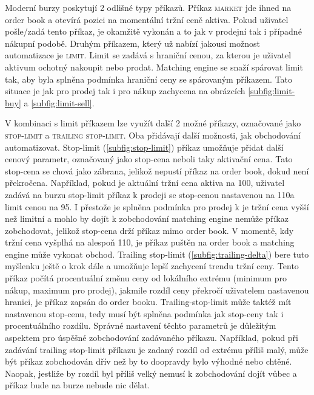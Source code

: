 Moderní burzy poskytují 2 odlišné typy příkazů. Příkaz \textsc{market} jde ihned na order book a otevírá pozici na momentální tržní ceně aktiva. Pokud uživatel
pošle/zadá tento příkaz, je okamžitě vykonán a to jak v prodejní tak i případné nákupní podobě. Druhým příkazem, který už nabízí jakousi možnost automatizace
je \textsc{limit}.
Limit se zadává s hraniční cenou, za kterou je uživatel aktivum ochotný nakoupit nebo prodat. Matching engine se snaží spárovat limit tak, aby byla splněna podmínka
hraniční ceny se spárovaným příkazem. Tato situace je jak pro prodej tak i pro nákup zachycena na obrázcích \ref{subfig:limit-buy} a \ref{subfig:limit-sell}.

V kombinaci s limit příkazem lze využít další 2 možné příkazy, označované jako \textsc{stop-limit} a \textsc{trailing stop-limit}. Oba přidávají další možnosti,
jak obchodování automatizovat. Stop-limit (\ref{subfig:stop-limit}) příkaz umožňuje přidat další cenový parametr, označovaný jako stop-cena neboli taky aktivační cena.
Tato stop-cena se chová jako zábrana, jelikož nepustí příkaz na order book, dokud není překročena. Například, pokud je aktuální tržní cena aktiva na 100\texteuro, uživatel zadává na burzu stop-limit příkaz k
prodeji se stop-cenou nastavenou na 110\texteuro a limit cenou na 95\texteuro. I přestože je splněna podmínka pro prodej k je tržní cena vyšší než limitní
a mohlo by dojít k zobchodování matching engine nemůže příkaz zobchodovat, jelikož stop-cena drží příkaz mimo order book. V momentě, kdy tržní cena vyšplhá na
alespoň 110\texteuro, je příkaz puštěn na order book a matching engine může vykonat obchod.
Trailing stop-limit (\ref{subfig:trailing-delta}) bere tuto myšlenku ještě o krok dále a umožňuje lepší zachycení trendu tržní ceny.
Tento příkaz počítá procentuální změnu ceny od lokálního
extrému (minimum pro nákup, maximum pro prodej), jakmile rozdíl ceny překročí uživatelem nastavenou hranici, je příkaz zapsán do order booku. Trailing-stop-limit
může taktéž mít nastavenou stop-cenu, tedy musí být splněna podmínka jak stop-ceny tak i procentuálního rozdílu.
Správné nastavení těchto parametrů je důležitým aspektem pro úspěšné zobchodování zadávaného příkazu. Například, pokud při zadávání trailing stop-limit příkazu
je zadaný rozdíl od extrému příliš malý, může být příkaz zobchodován dřív než by to doopravdy bylo výhodné nebo chtěné. Naopak, jestliže by rozdíl byl příliš velký
nemusí k zobchodování dojít vůbec a příkaz bude na burze nebude nic dělat.


